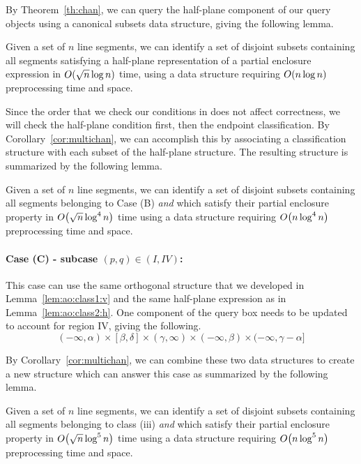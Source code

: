 By Theorem~\ref{th:chan}, we can query the half-plane component of our query objects using a canonical subsets data structure, giving the following lemma.

\begin{lemma}
\label{lem:ao:class2:h}
Given a set of $n$ line segments, we can identify a set of disjoint subsets containing all segments satisfying a half-plane representation of a partial enclosure expression in $O\!\left(\sqrt{n}\log{n}\right)$ time, using a data structure requiring $O\!\left(n\log{n}\right)$ preprocessing time and space.
\end{lemma}

Since the order that we check our conditions in does not affect correctness, we will check the half-plane condition first, then the endpoint classification.  
By Corollary~\ref{cor:multichan}, we can accomplish this by associating a classification structure with each subset of the half-plane structure. The resulting structure is summarized by the following lemma.

\begin{lemma}
\label{lem:ao:class2:c}
Given a set of $n$ line segments, we can identify a set of disjoint subsets containing all segments belonging to Case (B) \emph{and} which satisfy their partial enclosure property in $O\!\left(\sqrt{n}\log^4{n}\right)$ time using a data structure requiring $O\!\left(n\log^4{n}\right)$ preprocessing time and space.
\end{lemma}


\paragraph{Case (C) - subcase $(p, q) \in (I, IV)$:} 
This case can use the same orthogonal structure that we developed in Lemma~\ref{lem:ao:class1:v} and the same half-plane expression as in Lemma~\ref{lem:ao:class2:h}. 
One component of the query box needs to be updated to account for region IV, giving the following.
\[
(-\infty, \alpha) \times [\beta, \delta] \times (\gamma, \infty) \times (-\infty, \beta) \times (-\infty, \gamma - \alpha]
\]

By Corollary~\ref{cor:multichan}, we can combine these two data structures to create a new structure which can answer this case as summarized by the following lemma.

\begin{lemma}
\label{lem:ao:class3:c}
Given a set of $n$ line segments, we can identify a set of disjoint subsets containing all segments belonging to class (iii) \emph{and} which satisfy their partial enclosure property in $O\!\left(\sqrt{n}\log^5{n}\right)$ time using a data structure requiring $O\!\left(n\log^5{n}\right)$ preprocessing time and space.
\end{lemma}



